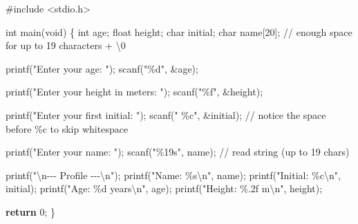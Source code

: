 \documentclass[
  letterpaper,
  DIV=11,
  numbers=noendperiod]{scrreprt}
\newenvironment{Shaded}{\begin{snugshade}}{\end{snugshade}}
\newcommand{\CommentTok}[1]{\textcolor[rgb]{0.37,0.37,0.37}{#1}}
\newcommand{\ControlFlowTok}[1]{\textcolor[rgb]{0.00,0.23,0.31}{\textbf{#1}}}
\newcommand{\DataTypeTok}[1]{\textcolor[rgb]{0.68,0.00,0.00}{#1}}
\newcommand{\DecValTok}[1]{\textcolor[rgb]{0.68,0.00,0.00}{#1}}
\newcommand{\ImportTok}[1]{\textcolor[rgb]{0.00,0.46,0.62}{#1}}
\newcommand{\NormalTok}[1]{\textcolor[rgb]{0.00,0.23,0.31}{#1}}
\newcommand{\OperatorTok}[1]{\textcolor[rgb]{0.37,0.37,0.37}{#1}}
\newcommand{\PreprocessorTok}[1]{\textcolor[rgb]{0.68,0.00,0.00}{#1}}
\newcommand{\SpecialCharTok}[1]{\textcolor[rgb]{0.37,0.37,0.37}{#1}}
\newcommand{\StringTok}[1]{\textcolor[rgb]{0.13,0.47,0.30}{#1}}
\begin{document}
\begin{Shaded}
\begin{Highlighting}[]
\PreprocessorTok{\#include }\ImportTok{\textless{}stdio.h\textgreater{}}

\DataTypeTok{int}\NormalTok{ main}\OperatorTok{(}\DataTypeTok{void}\OperatorTok{)} \OperatorTok{\{}
    \DataTypeTok{int}\NormalTok{ age}\OperatorTok{;}
    \DataTypeTok{float}\NormalTok{ height}\OperatorTok{;}
    \DataTypeTok{char}\NormalTok{ initial}\OperatorTok{;}
    \DataTypeTok{char}\NormalTok{ name}\OperatorTok{[}\DecValTok{20}\OperatorTok{];}   \CommentTok{// enough space for up to 19 characters + \textquotesingle{}\textbackslash{}0\textquotesingle{}}

\NormalTok{    printf}\OperatorTok{(}\StringTok{"Enter your age: "}\OperatorTok{);}
\NormalTok{    scanf}\OperatorTok{(}\StringTok{"}\SpecialCharTok{\%d}\StringTok{"}\OperatorTok{,} \OperatorTok{\&}\NormalTok{age}\OperatorTok{);}

\NormalTok{    printf}\OperatorTok{(}\StringTok{"Enter your height in meters: "}\OperatorTok{);}
\NormalTok{    scanf}\OperatorTok{(}\StringTok{"}\SpecialCharTok{\%f}\StringTok{"}\OperatorTok{,} \OperatorTok{\&}\NormalTok{height}\OperatorTok{);}

\NormalTok{    printf}\OperatorTok{(}\StringTok{"Enter your first initial: "}\OperatorTok{);}
\NormalTok{    scanf}\OperatorTok{(}\StringTok{" }\SpecialCharTok{\%c}\StringTok{"}\OperatorTok{,} \OperatorTok{\&}\NormalTok{initial}\OperatorTok{);}   \CommentTok{// notice the space before \%c to skip whitespace}

\NormalTok{    printf}\OperatorTok{(}\StringTok{"Enter your name: "}\OperatorTok{);}
\NormalTok{    scanf}\OperatorTok{(}\StringTok{"}\SpecialCharTok{\%19s}\StringTok{"}\OperatorTok{,}\NormalTok{ name}\OperatorTok{);}      \CommentTok{// read string (up to 19 chars)}

\NormalTok{    printf}\OperatorTok{(}\StringTok{"}\SpecialCharTok{\textbackslash{}n}\StringTok{{-}{-}{-} Profile {-}{-}{-}}\SpecialCharTok{\textbackslash{}n}\StringTok{"}\OperatorTok{);}
\NormalTok{    printf}\OperatorTok{(}\StringTok{"Name: }\SpecialCharTok{\%s\textbackslash{}n}\StringTok{"}\OperatorTok{,}\NormalTok{ name}\OperatorTok{);}
\NormalTok{    printf}\OperatorTok{(}\StringTok{"Initial: }\SpecialCharTok{\%c\textbackslash{}n}\StringTok{"}\OperatorTok{,}\NormalTok{ initial}\OperatorTok{);}
\NormalTok{    printf}\OperatorTok{(}\StringTok{"Age: }\SpecialCharTok{\%d}\StringTok{ years}\SpecialCharTok{\textbackslash{}n}\StringTok{"}\OperatorTok{,}\NormalTok{ age}\OperatorTok{);}
\NormalTok{    printf}\OperatorTok{(}\StringTok{"Height: }\SpecialCharTok{\%.2f}\StringTok{ m}\SpecialCharTok{\textbackslash{}n}\StringTok{"}\OperatorTok{,}\NormalTok{ height}\OperatorTok{);}

    \ControlFlowTok{return} \DecValTok{0}\OperatorTok{;}
\OperatorTok{\}}
\end{Highlighting}
\end{Shaded}
\end{document}
